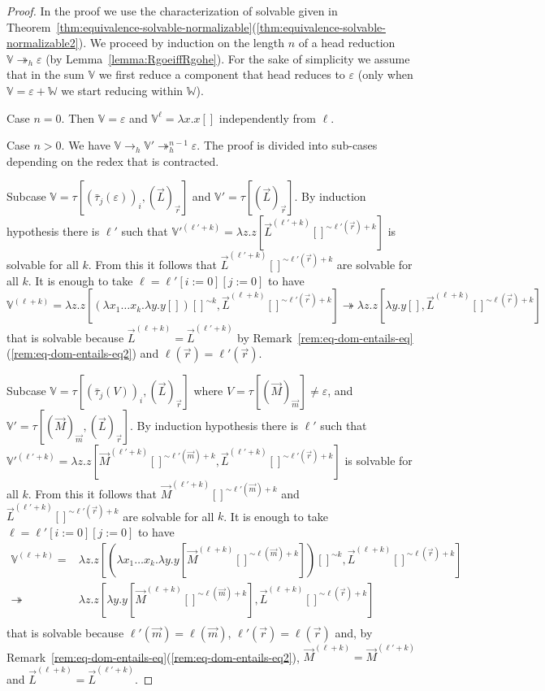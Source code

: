 \documentclass{LMCS}
\newcommand{\lam}{\ensuremath{\lambda}}
\newcommand{\msto}{\twoheadrightarrow}
\newcommand{\seq}[1]{\vec{#1}}
\newcommand{\sV}{\mathbb{V}}
\newcommand{\sW}{\mathbb{W}}
\newcommand{\gt}{\ensuremath{\tau}}
\newcommand{\gto}{\ensuremath{\bar\tau}}
\begin{document}
\begin{proof} 
In the proof we use the characterization of solvable given in Theorem~\ref{thm:equivalence-solvable-normalizable}(\ref{thm:equivalence-solvable-normalizable2}).
We proceed by induction on the length $n$ of a head reduction $\sV\msto_h \varepsilon$ (by Lemma~\ref{lemma:RgoeiffRgohe}).
For the sake of simplicity we assume that in the sum $\sV$ we first reduce a component that head reduces to $\varepsilon$ 
(only when $\sV = \varepsilon + \sW$ we start reducing within $\sW$).

Case $n=0$. Then $\sV = \varepsilon$ and $\sV^\ell = \lam x.x[]$ independently from $\ell$.

Case $n > 0$. We have $\sV\to_h \sV'\msto^{n-1}_h \varepsilon$. The proof is divided into sub-cases depending on the redex that is contracted. 

Subcase $\sV = \gt[(\gto_j(\varepsilon))_i, (\seq L)_{\seq r}]$ and $\sV' = \gt[(\seq L)_{\seq r}]$. 
By induction hypothesis there is $\ell'$ such that $\sV'^{(\ell' +k)} = \lam z.z[\seq L^{(\ell' +k)}[]^{\sim\ell'(\seq r) + k}]$ is solvable for all $k$. 
From this it follows that $\seq L^{(\ell' +k)}[]^{\sim\ell'(\seq r) + k}$ are solvable for all $k$.
It is enough to take $\ell = \ell'[i:= 0][j:=0]$ to have $\sV^{(\ell + k)} = \lam z.z[(\lam x_1\ldots x_{k}.\lam y.y[]) []^{\sim k},\seq L^{(\ell +k)}[]^{\sim\ell'(\seq r) + k}]
\msto \lam z.z[\lam y.y[],\seq L^{(\ell +k)}[]^{\sim\ell(\seq r) + k}]$ that is solvable because $\seq L^{(\ell +k)} = \seq L^{(\ell' +k)}$
by Remark~\ref{rem:eq-dom-entails-eq}(\ref{rem:eq-dom-entails-eq2}) and $\ell(\seq r) = \ell'(\seq r)$.

Subcase $\sV = \gt[(\gto_j(V))_{i}, (\seq L)_{\seq r}]$ where $V = \gt[(\seq M)_{\seq m}]\neq\varepsilon$,
and $\sV' = \gt[(\seq M)_{\seq m}, (\seq L)_{\seq r}]$. 
By induction hypothesis there is $\ell'$ such that $\sV'^{(\ell' +k)} = 
\lam z.z[\seq M^{(\ell' +k)}[]^{\sim\ell'(\seq m)+k},\seq L^{(\ell' +k)}[]^{\sim\ell'(\seq r)+k}]$ is solvable for all $k$. 
From this it follows that $\seq M^{(\ell' +k)}[]^{\sim\ell'(\seq m)+k}$ and $\seq L^{(\ell' +k)}[]^{\sim\ell'(\seq r)+k}$ are solvable for all $k$.
It is enough to take $\ell = \ell'[i:= 0][j:=0]$ to have 
$$
\begin{array}{rl}
\sV^{(\ell + k)} = &\lam z.z[(\lam x_1\ldots x_{k}.\lam y.y[\seq M^{(\ell +k)}[]^{\sim\ell(\seq m) + k}]) []^{\sim k},\seq L^{(\ell +k)}[]^{\sim\ell(\seq r) +k}]\\
\msto &\lam z.z[\lam y.y[\seq M^{(\ell +k)}[]^{\sim\ell(\seq m) + k}],\seq L^{(\ell +k)}[]^{\sim\ell(\seq r) +k}]\\
\end{array}
$$ 
that is solvable because $\ell'(\seq m) = \ell(\seq m)$, $\ell'(\seq r) = \ell(\seq r)$ and, by Remark~\ref{rem:eq-dom-entails-eq}(\ref{rem:eq-dom-entails-eq2}), 
$\seq M^{(\ell +k)}=\seq M^{(\ell' +k)}$ and $\seq L^{(\ell +k)} = \seq L^{(\ell' +k)}$.


\end{proof}
\end{document}
